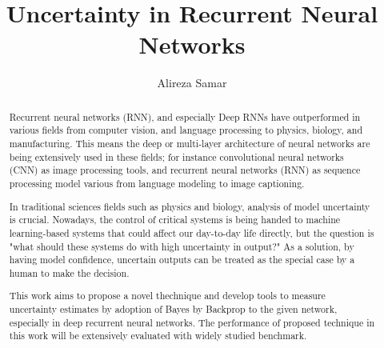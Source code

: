 \documentclass{utmthesis}
\begin{document}
\title{Uncertainty in Recurrent Neural Networks}
\author{Alireza Samar}



\maketitle



\begin{abstract}
Recurrent neural networks (RNN), and especially Deep RNNs have outperformed in various fields from computer vision, and language processing to physics, biology, and manufacturing. This means the deep or multi-layer architecture of neural networks are being extensively used in these fields; for instance convolutional neural networks (CNN) as image processing tools, and recurrent neural networks (RNN) as sequence processing model various from language modeling to image captioning.

In traditional sciences fields such as physics and biology, analysis of model uncertainty is crucial. Nowadays, the control of critical systems is being handed to machine learning-based systems that could affect our day-to-day life directly, but the question is "what should these systems do with high uncertainty in output?" As a solution, by having model confidence, uncertain outputs can be treated as the special case by a human to make the decision.

This work aims to propose a novel thechnique and develop tools to measure uncertainty estimates by adoption of Bayes by Backprop to the given network, especially in deep recurrent neural networks. The performance of proposed technique in this work will be extensively evaluated with widely studied benchmark.

\end{abstract}
\end{document}
